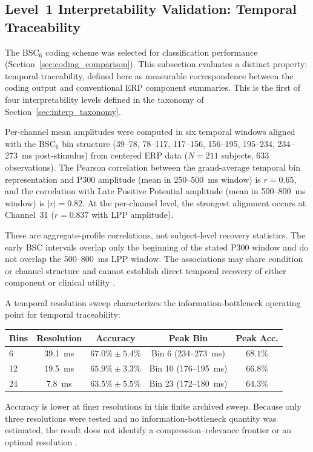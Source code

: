\subsection{Level~1 Interpretability Validation: Temporal Traceability}
\label{sec:ch4_temporal_traceability}

The BSC$_6$ coding scheme was selected for classification performance (Section~\ref{sec:coding_comparison}). This subsection evaluates a distinct property: temporal traceability, defined here as measurable correspondence between the coding output and conventional ERP component summaries. This is the first of four interpretability levels defined in the taxonomy of Section~\ref{sec:interp_taxonomy}.

Per-channel mean amplitudes were computed in six temporal windows aligned with the BSC$_6$ bin structure (39--78, 78--117, 117--156, 156--195, 195--234, 234--273~ms post-stimulus) from centered ERP data ($N = 211$ subjects, $633$ observations). The Pearson correlation between the grand-average temporal bin representation and P300 amplitude (mean in 250--500~ms window) is $r = 0.65$, and the correlation with Late Positive Potential amplitude (mean in 500--800~ms window) is $|r| = 0.82$. At the per-channel level, the strongest alignment occurs at Channel~31 ($r = 0.837$ with LPP amplitude).

These are aggregate-profile correlations, not subject-level recovery statistics. The early BSC intervals overlap only the beginning of the stated P300 window and do not overlap the 500--800~ms LPP window. The associations may share condition or channel structure and cannot establish direct temporal recovery of either component or clinical utility \cite{nelson_hajcak_2017}.

A temporal resolution sweep characterizes the information-bottleneck operating point for temporal traceability:
\begin{center}
\begin{tabular}{lcccc}
\toprule
\textbf{Bins} & \textbf{Resolution} & \textbf{Accuracy} & \textbf{Peak Bin} & \textbf{Peak Acc.} \\
\midrule
6 & 39.1~ms & $67.0\% \pm 5.4\%$ & Bin 6 (234--273~ms) & $68.1\%$ \\
12 & 19.5~ms & $65.9\% \pm 3.3\%$ & Bin 10 (176--195~ms) & $66.8\%$ \\
24 & 7.8~ms & $63.5\% \pm 5.5\%$ & Bin 23 (172--180~ms) & $64.3\%$ \\
\bottomrule
\end{tabular}
\end{center}
Accuracy is lower at finer resolutions in this finite archived sweep. Because only three resolutions were tested and no information-bottleneck quantity was estimated, the result does not identify a compression--relevance frontier or an optimal resolution \cite{tishby_deep_2015}.

